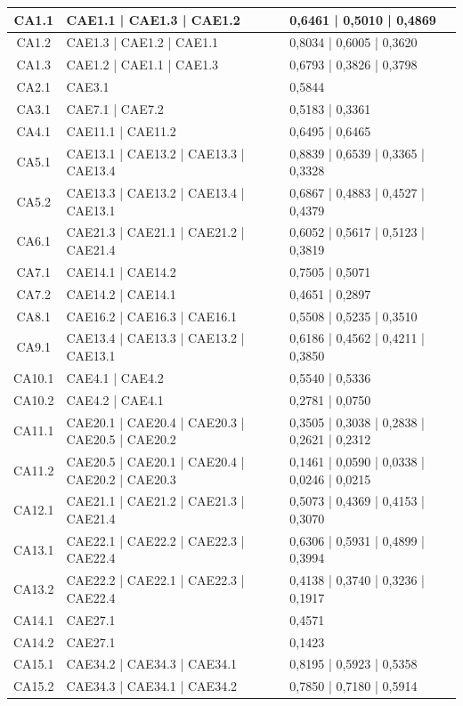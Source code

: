 \documentclass{prgrado}
\begin{document}
\begin{longtable}{|c|p{5cm}|p{4cm}|}
CA1.1 & CAE1.1 | CAE1.3 | CAE1.2 & 0,6461 | 0,5010 | 0,4869 \\ \hline
CA1.2 & CAE1.3 | CAE1.2 | CAE1.1 & 0,8034 | 0,6005 | 0,3620 \\ \hline
CA1.3 & CAE1.2 | CAE1.1 | CAE1.3 & 0,6793 | 0,3826 | 0,3798 \\ \hline
CA2.1 & CAE3.1 & 0,5844 \\ \hline
CA3.1 & CAE7.1 | CAE7.2 & 0,5183 | 0,3361 \\ \hline
CA4.1 & CAE11.1 | CAE11.2 & 0,6495 | 0,6465 \\ \hline
CA5.1 & CAE13.1 | CAE13.2 | CAE13.3 | CAE13.4 & 0,8839 | 0,6539 | 0,3365 | 0,3328 \\ \hline
CA5.2 & CAE13.3 | CAE13.2 | CAE13.4 | CAE13.1 & 0,6867 | 0,4883 | 0,4527 | 0,4379 \\ \hline
CA6.1 & CAE21.3 | CAE21.1 | CAE21.2 | CAE21.4 & 0,6052 | 0,5617 | 0,5123 | 0,3819 \\ \hline
CA7.1 & CAE14.1 | CAE14.2 & 0,7505 | 0,5071 \\ \hline
CA7.2 & CAE14.2 | CAE14.1 & 0,4651 | 0,2897 \\ \hline
CA8.1 & CAE16.2 | CAE16.3 | CAE16.1 & 0,5508 | 0,5235 | 0,3510 \\ \hline
CA9.1 & CAE13.4 | CAE13.3 | CAE13.2 | CAE13.1 & 0,6186 | 0,4562 | 0,4211 | 0,3850 \\ \hline
CA10.1 & CAE4.1 | CAE4.2 & 0,5540 | 0,5336 \\ \hline
CA10.2 & CAE4.2 | CAE4.1 & 0,2781 | 0,0750 \\ \hline
CA11.1 & CAE20.1 | CAE20.4 | CAE20.3 | CAE20.5 | CAE20.2 & 0,3505 | 0,3038 | 0,2838 | 0,2621 | 0,2312 \\ \hline
CA11.2 & CAE20.5 | CAE20.1 | CAE20.4 | CAE20.2 | CAE20.3 & 0,1461 | 0,0590 | 0,0338 | 0,0246 | 0,0215 \\ \hline
CA12.1 & CAE21.1 | CAE21.2 | CAE21.3 | CAE21.4 & 0,5073 | 0,4369 | 0,4153 | 0,3070 \\ \hline
CA13.1 & CAE22.1 | CAE22.2 | CAE22.3 | CAE22.4 & 0,6306 | 0,5931 | 0,4899 | 0,3994 \\ \hline
CA13.2 & CAE22.2 | CAE22.1 | CAE22.3 | CAE22.4 & 0,4138 | 0,3740 | 0,3236 | 0,1917 \\ \hline
CA14.1 & CAE27.1 & 0,4571 \\ \hline
CA14.2 & CAE27.1 & 0,1423 \\ \hline
CA15.1 & CAE34.2 | CAE34.3 | CAE34.1 & 0,8195 | 0,5923 | 0,5358 \\ \hline
CA15.2 & CAE34.3 | CAE34.1 | CAE34.2 & 0,7850 | 0,7180 | 0,5914 \\ \hline

\end{longtable}
\end{document}
